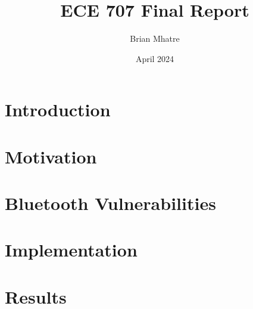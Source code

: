 \documentclass{article}
\title{ECE 707 Final Report}
\author{Brian Mhatre}
\date{April 2024}
\begin{document}
\maketitle

\section{Introduction}
\section{Motivation}
\section{Bluetooth Vulnerabilities}
\section{Implementation}
\section{Results}
\end{document}
